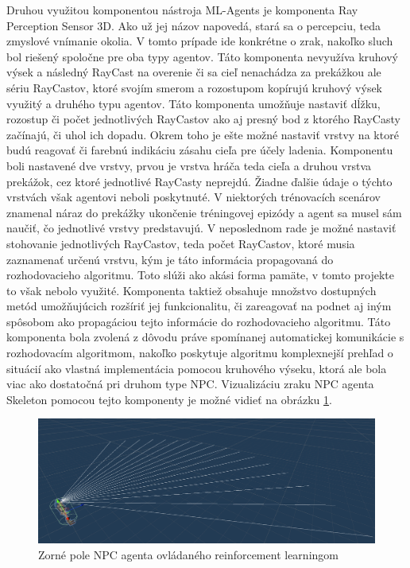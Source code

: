 \documentclass[slovak, master]{diploma}
\begin{document}
Druhou využitou komponentou nástroja ML-Agents je komponenta Ray Perception Sensor 3D. Ako už jej názov napovedá, stará sa o percepciu, teda zmyslové vnímanie okolia. V tomto prípade ide konkrétne o zrak, nakoľko sluch bol riešený spoločne pre oba typy agentov. Táto komponenta nevyužíva kruhový výsek a následný RayCast na overenie či sa cieľ nenachádza za prekážkou ale sériu RayCastov, ktoré svojím smerom a rozostupom kopírujú kruhový výsek využitý a druhého typu agentov. Táto komponenta umožňuje nastaviť dĺžku, rozostup či počet jednotlivých RayCastov ako aj presný bod z ktorého RayCasty začínajú, či uhol ich dopadu. Okrem toho je ešte možné nastaviť vrstvy na ktoré budú reagovať či farebnú indikáciu zásahu cieľa pre účely ladenia. Komponentu boli nastavené dve vrstvy, prvou je vrstva hráča teda cieľa a druhou vrstva prekážok, cez ktoré jednotlivé RayCasty neprejdú. Žiadne ďalšie údaje o týchto vrstvách však agentovi neboli poskytnuté. V niektorých trénovacích scenárov znamenal náraz do prekážky ukončenie tréningovej epizódy a agent sa musel sám naučiť, čo jednotlivé vrstvy predstavujú. V neposlednom rade je možné nastaviť stohovanie jednotlivých RayCastov, teda počet RayCastov, ktoré musia zaznamenať určenú vrstvu, kým je táto informácia propagovaná do rozhodovacieho algoritmu. Toto slúži ako akási forma pamäte, v tomto projekte to však nebolo využité. Komponenta taktiež obsahuje množstvo dostupných metód umožňujúcich rozšíriť jej funkcionalitu, či zareagovať na podnet aj iným spôsobom ako propagáciou tejto informácie do rozhodovacieho algoritmu. Táto komponenta bola zvolená z dôvodu práve spomínanej automatickej komunikácie s rozhodovacím algoritmom, nakoľko poskytuje algoritmu komplexnejší prehľad o situácií ako vlastná implementácia pomocou kruhového výseku, ktorá ale bola viac ako dostatočná pri druhom type NPC. Vizualizáciu zraku NPC agenta Skeleton pomocou tejto komponenty je možné vidieť na obrázku \ref{pic:rayPercept}. 

\begin{figure}[!htbp]
    \centering
    \includegraphics[width=1\textwidth]{Figures/rayperceptron.png}
    \caption{Zorné pole NPC agenta ovládaného reinforcement learningom}
    \label{pic:rayPercept}
\end{figure}
\end{document}
